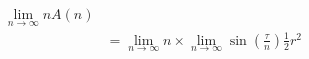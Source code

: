 \documentclass[preview]{standalone}
\begin{document}
\begin{align*}
\lim_{n \to \infty} n A (n) \\ &= \lim_{n \to \infty} n \times \lim_{n \to \infty} \sin \left( \frac {\tau} {n} \right) \frac {1} {2} r^2
\end{align*}
\end{document}
